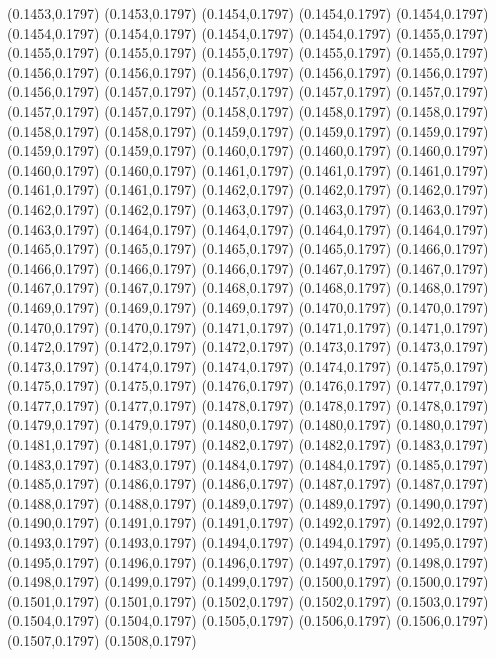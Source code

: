 (0.1453,0.1797)
(0.1453,0.1797)
(0.1454,0.1797)
(0.1454,0.1797)
(0.1454,0.1797)
(0.1454,0.1797)
(0.1454,0.1797)
(0.1454,0.1797)
(0.1454,0.1797)
(0.1455,0.1797)
(0.1455,0.1797)
(0.1455,0.1797)
(0.1455,0.1797)
(0.1455,0.1797)
(0.1455,0.1797)
(0.1456,0.1797)
(0.1456,0.1797)
(0.1456,0.1797)
(0.1456,0.1797)
(0.1456,0.1797)
(0.1456,0.1797)
(0.1457,0.1797)
(0.1457,0.1797)
(0.1457,0.1797)
(0.1457,0.1797)
(0.1457,0.1797)
(0.1457,0.1797)
(0.1458,0.1797)
(0.1458,0.1797)
(0.1458,0.1797)
(0.1458,0.1797)
(0.1458,0.1797)
(0.1459,0.1797)
(0.1459,0.1797)
(0.1459,0.1797)
(0.1459,0.1797)
(0.1459,0.1797)
(0.1460,0.1797)
(0.1460,0.1797)
(0.1460,0.1797)
(0.1460,0.1797)
(0.1460,0.1797)
(0.1461,0.1797)
(0.1461,0.1797)
(0.1461,0.1797)
(0.1461,0.1797)
(0.1461,0.1797)
(0.1462,0.1797)
\PST@Solid(0.1462,0.1797)
(0.1462,0.1797)
(0.1462,0.1797)
(0.1462,0.1797)
(0.1463,0.1797)
(0.1463,0.1797)
(0.1463,0.1797)
(0.1463,0.1797)
(0.1464,0.1797)
(0.1464,0.1797)
(0.1464,0.1797)
(0.1464,0.1797)
(0.1465,0.1797)
(0.1465,0.1797)
(0.1465,0.1797)
(0.1465,0.1797)
(0.1466,0.1797)
(0.1466,0.1797)
(0.1466,0.1797)
(0.1466,0.1797)
(0.1467,0.1797)
(0.1467,0.1797)
(0.1467,0.1797)
(0.1467,0.1797)
(0.1468,0.1797)
(0.1468,0.1797)
(0.1468,0.1797)
(0.1469,0.1797)
(0.1469,0.1797)
(0.1469,0.1797)
(0.1470,0.1797)
(0.1470,0.1797)
(0.1470,0.1797)
(0.1470,0.1797)
(0.1471,0.1797)
(0.1471,0.1797)
(0.1471,0.1797)
(0.1472,0.1797)
(0.1472,0.1797)
(0.1472,0.1797)
(0.1473,0.1797)
(0.1473,0.1797)
(0.1473,0.1797)
(0.1474,0.1797)
(0.1474,0.1797)
(0.1474,0.1797)
(0.1475,0.1797)
(0.1475,0.1797)
(0.1475,0.1797)
(0.1476,0.1797)
(0.1476,0.1797)
(0.1477,0.1797)
(0.1477,0.1797)
(0.1477,0.1797)
(0.1478,0.1797)
(0.1478,0.1797)
(0.1478,0.1797)
(0.1479,0.1797)
(0.1479,0.1797)
(0.1480,0.1797)
(0.1480,0.1797)
(0.1480,0.1797)
(0.1481,0.1797)
(0.1481,0.1797)
(0.1482,0.1797)
(0.1482,0.1797)
(0.1483,0.1797)
(0.1483,0.1797)
(0.1483,0.1797)
(0.1484,0.1797)
(0.1484,0.1797)
(0.1485,0.1797)
(0.1485,0.1797)
(0.1486,0.1797)
(0.1486,0.1797)
(0.1487,0.1797)
(0.1487,0.1797)
(0.1488,0.1797)
(0.1488,0.1797)
(0.1489,0.1797)
(0.1489,0.1797)
(0.1490,0.1797)
(0.1490,0.1797)
(0.1491,0.1797)
(0.1491,0.1797)
(0.1492,0.1797)
(0.1492,0.1797)
(0.1493,0.1797)
(0.1493,0.1797)
(0.1494,0.1797)
(0.1494,0.1797)
(0.1495,0.1797)
(0.1495,0.1797)
(0.1496,0.1797)
(0.1496,0.1797)
(0.1497,0.1797)
(0.1498,0.1797)
(0.1498,0.1797)
(0.1499,0.1797)
(0.1499,0.1797)
(0.1500,0.1797)
\PST@Solid(0.1500,0.1797)
(0.1501,0.1797)
(0.1501,0.1797)
(0.1502,0.1797)
(0.1502,0.1797)
(0.1503,0.1797)
(0.1504,0.1797)
(0.1504,0.1797)
(0.1505,0.1797)
(0.1506,0.1797)
(0.1506,0.1797)
(0.1507,0.1797)
(0.1508,0.1797)
